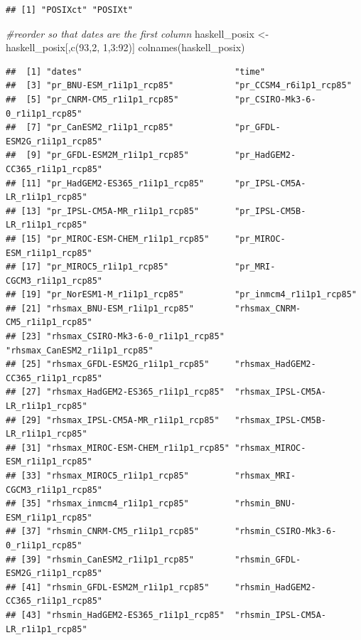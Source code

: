 \documentclass[
  paper=a4,
  ,captions=tableheading
]{scrartcl}
\newenvironment{Shaded}{\begin{snugshade}}{\end{snugshade}}
\newcommand{\CommentTok}[1]{\textcolor[rgb]{0.56,0.35,0.01}{\textit{#1}}}
\newcommand{\DecValTok}[1]{\textcolor[rgb]{0.00,0.00,0.81}{#1}}
\newcommand{\FunctionTok}[1]{\textcolor[rgb]{0.00,0.00,0.00}{#1}}
\newcommand{\NormalTok}[1]{#1}
\newcommand{\OtherTok}[1]{\textcolor[rgb]{0.56,0.35,0.01}{#1}}
\newcommand{\SpecialCharTok}[1]{\textcolor[rgb]{0.00,0.00,0.00}{#1}}
\begin{document}
\begin{verbatim}
## [1] "POSIXct" "POSIXt"
\end{verbatim}

\begin{Shaded}
\begin{Highlighting}[]
\CommentTok{\#reorder so that dates are the first column}
\NormalTok{haskell\_posix }\OtherTok{\textless{}{-}}\NormalTok{ haskell\_posix[,}\FunctionTok{c}\NormalTok{(}\DecValTok{93}\NormalTok{,}\DecValTok{2}\NormalTok{, }\DecValTok{1}\NormalTok{,}\DecValTok{3}\SpecialCharTok{:}\DecValTok{92}\NormalTok{)]}
\FunctionTok{colnames}\NormalTok{(haskell\_posix)}
\end{Highlighting}
\end{Shaded}

\begin{verbatim}
##  [1] "dates"                              "time"                              
##  [3] "pr_BNU-ESM_r1i1p1_rcp85"            "pr_CCSM4_r6i1p1_rcp85"             
##  [5] "pr_CNRM-CM5_r1i1p1_rcp85"           "pr_CSIRO-Mk3-6-0_r1i1p1_rcp85"     
##  [7] "pr_CanESM2_r1i1p1_rcp85"            "pr_GFDL-ESM2G_r1i1p1_rcp85"        
##  [9] "pr_GFDL-ESM2M_r1i1p1_rcp85"         "pr_HadGEM2-CC365_r1i1p1_rcp85"     
## [11] "pr_HadGEM2-ES365_r1i1p1_rcp85"      "pr_IPSL-CM5A-LR_r1i1p1_rcp85"      
## [13] "pr_IPSL-CM5A-MR_r1i1p1_rcp85"       "pr_IPSL-CM5B-LR_r1i1p1_rcp85"      
## [15] "pr_MIROC-ESM-CHEM_r1i1p1_rcp85"     "pr_MIROC-ESM_r1i1p1_rcp85"         
## [17] "pr_MIROC5_r1i1p1_rcp85"             "pr_MRI-CGCM3_r1i1p1_rcp85"         
## [19] "pr_NorESM1-M_r1i1p1_rcp85"          "pr_inmcm4_r1i1p1_rcp85"            
## [21] "rhsmax_BNU-ESM_r1i1p1_rcp85"        "rhsmax_CNRM-CM5_r1i1p1_rcp85"      
## [23] "rhsmax_CSIRO-Mk3-6-0_r1i1p1_rcp85"  "rhsmax_CanESM2_r1i1p1_rcp85"       
## [25] "rhsmax_GFDL-ESM2G_r1i1p1_rcp85"     "rhsmax_HadGEM2-CC365_r1i1p1_rcp85" 
## [27] "rhsmax_HadGEM2-ES365_r1i1p1_rcp85"  "rhsmax_IPSL-CM5A-LR_r1i1p1_rcp85"  
## [29] "rhsmax_IPSL-CM5A-MR_r1i1p1_rcp85"   "rhsmax_IPSL-CM5B-LR_r1i1p1_rcp85"  
## [31] "rhsmax_MIROC-ESM-CHEM_r1i1p1_rcp85" "rhsmax_MIROC-ESM_r1i1p1_rcp85"     
## [33] "rhsmax_MIROC5_r1i1p1_rcp85"         "rhsmax_MRI-CGCM3_r1i1p1_rcp85"     
## [35] "rhsmax_inmcm4_r1i1p1_rcp85"         "rhsmin_BNU-ESM_r1i1p1_rcp85"       
## [37] "rhsmin_CNRM-CM5_r1i1p1_rcp85"       "rhsmin_CSIRO-Mk3-6-0_r1i1p1_rcp85" 
## [39] "rhsmin_CanESM2_r1i1p1_rcp85"        "rhsmin_GFDL-ESM2G_r1i1p1_rcp85"    
## [41] "rhsmin_GFDL-ESM2M_r1i1p1_rcp85"     "rhsmin_HadGEM2-CC365_r1i1p1_rcp85" 
## [43] "rhsmin_HadGEM2-ES365_r1i1p1_rcp85"  "rhsmin_IPSL-CM5A-LR_r1i1p1_rcp85"  

\end{verbatim}
\end{document}
